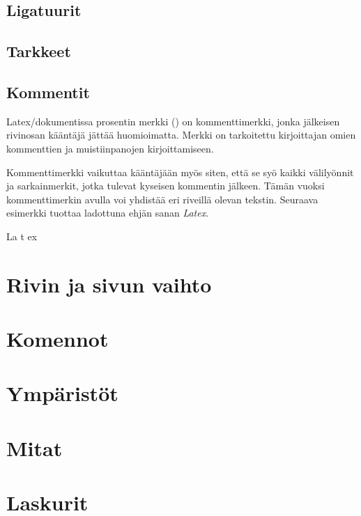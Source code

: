 \subsection{Ligatuurit}
\subsection{Tarkkeet}
\label{luku:tarkkeet}

\subsection{Kommentit}

Latex\-/dokumentissa prosentin merkki (\koodi{\%}) on kommenttimerkki,
jonka jälkeisen rivin\-osan kääntäjä jättää huomioimatta. Merkki on
tarkoitettu kirjoittajan omien kommenttien ja muistiinpanojen
kirjoittamiseen.

\begin{koodilohkosis}
\end{koodilohkosis}

Kommenttimerkki vaikuttaa kääntäjään myös siten, että se syö kaikki
välilyönnit ja sarkainmerkit, jotka tulevat kyseisen kommentin jälkeen.
Tämän vuoksi kommenttimerkin avulla voi yhdistää eri riveillä olevan
tekstin. Seuraava esimerkki tuottaa ladottuna ehjän sanan \emph{Latex}.

\begin{koodilohkosis}
  La%
    t%
      ex
\end{koodilohkosis}

\section{Rivin ja sivun vaihto}
\section{Komennot}
\label{luku:komennot}
\section{Ympäristöt}
\label{luku:ymparistot}
\section{Mitat}
\label{luku:mitat}
\section{Laskurit}
